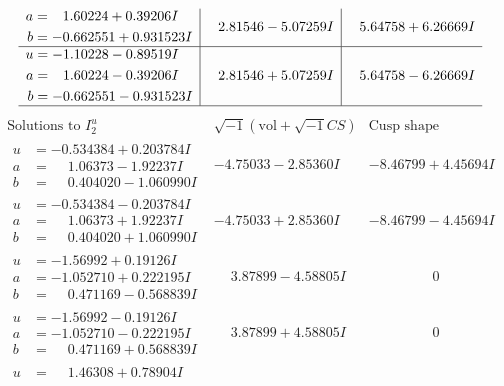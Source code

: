 \documentclass[1p]{elsarticle_modified}
\theoremstyle{definition}
\newcommand{\I}{\sqrt{-1}}
\begin{document}
$$\begin{array}{c|c|c}
\begin{aligned}
a &= \phantom{-}1.60224 + 0.39206 I \\
b &= -0.662551 + 0.931523 I\end{aligned}
 & \phantom{-}2.81546 - 5.07259 I & \phantom{-}5.64758 + 6.26669 I \\ \hline\begin{aligned}
u &= -1.10228 - 0.89519 I \\
a &= \phantom{-}1.60224 - 0.39206 I \\
b &= -0.662551 - 0.931523 I\end{aligned}
 & \phantom{-}2.81546 + 5.07259 I & \phantom{-}5.64758 - 6.26669 I\\
 \hline 
 \end{array}$$\newpage$$\begin{array}{c|c|c}  
\text{Solutions to }I^u_{2}& \I (\text{vol} + \sqrt{-1}CS) & \text{Cusp shape}\\
 \hline 
\begin{aligned}
u &= -0.534384 + 0.203784 I \\
a &= \phantom{-}1.06373 - 1.92237 I \\
b &= \phantom{-}0.404020 - 1.060990 I\end{aligned}
 & -4.75033 - 2.85360 I & -8.46799 + 4.45694 I \\ \hline\begin{aligned}
u &= -0.534384 - 0.203784 I \\
a &= \phantom{-}1.06373 + 1.92237 I \\
b &= \phantom{-}0.404020 + 1.060990 I\end{aligned}
 & -4.75033 + 2.85360 I & -8.46799 - 4.45694 I \\ \hline\begin{aligned}
u &= -1.56992 + 0.19126 I \\
a &= -1.052710 + 0.222195 I \\
b &= \phantom{-}0.471169 - 0.568839 I\end{aligned}
 & \phantom{-}3.87899 - 4.58805 I & \phantom{-0.000000 } 0 \\ \hline\begin{aligned}
u &= -1.56992 - 0.19126 I \\
a &= -1.052710 - 0.222195 I \\
b &= \phantom{-}0.471169 + 0.568839 I\end{aligned}
 & \phantom{-}3.87899 + 4.58805 I & \phantom{-0.000000 } 0 \\ \hline\begin{aligned}
u &= \phantom{-}1.46308 + 0.78904 I \\

\end{aligned}
\end{array}$$
\end{document}
